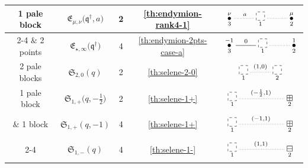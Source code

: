\documentclass[10pt,a4paper]{amsart}
\numberwithin{equation}{section}
\newcommand{\sele}{\mathfrak{S}}
\newcommand{\eny}{\mathfrak{E}}
\newcommand{\enyIIb}[1]{\eny_{\star,#1}}
\newcommand{\bq}{\mathfrak{q}}
\newcommand{\bqs}{\bq^{\dagger}}
\begin{document}
\begin{table}[ht]
\begin{tabular}{c| c c c |c}
{\small 1 pale block}
& $\eny_{\mu, \nu}\big(\bqs, a\big)$ & 2 & \ref{th:endymion-rank4-1} & $\xymatrix{
\overset{\nu}{\underset{3}{\bullet}} \ar@{.}^{a}[r]
&\underset{1}{\begin{tikzpicture}
\draw[dashed] (0,0) rectangle (0.36,0.36);
\end{tikzpicture}} \ar @{.}[r]
& \overset{\mu}{\underset{2}{\bullet}}}$
\\ \cline{2-4}
$\&$ {\small 2 points} & $\enyIIb{\infty}\big(\bqs\big)$ & 4 & \ref{th:endymion-2pts-case-a} &
$\xymatrix{
\overset{-1}{\underset{3}{\bullet}} \ar@{-}^{0}[r]
&\underset{1}{\begin{tikzpicture}
\draw[dashed] (0,0) rectangle (0.36,0.36);
\end{tikzpicture}} \ar @{.}[r]
& \overset{1}{\underset{2}{\bullet}}}$
\\ \hline
{\small 2 pale blocks} & $\sele_{2,0}(q)$ & 2 & \ref{th:selene-2-0} &
$\xymatrix{
\underset{1}{\begin{tikzpicture}
\draw[dashed] (0,0) rectangle (0.36,0.36);
\end{tikzpicture}} \ar@{.}^{(1,0)}[r]
&\underset{2}{\begin{tikzpicture}
\draw[dashed] (0,0) rectangle (0.36,0.36);
\end{tikzpicture}} }$
\\ \hline
{\small 1 pale block}
& $\sele_{1,+}\big(q,-\frac12\big)$ & 2 &\ref{th:selene-1+}
& $
\xymatrix{
\underset{1}{\begin{tikzpicture}
\draw[dashed] (0,0) rectangle (0.36,0.36);
\end{tikzpicture}} \ar @{.}^{(-\frac12,1)}[rr]
& &\underset{2}{\boxplus}}$
\\
$\&$ {\small 1 block}
& $\sele_{1,+}(q,-1)$ & 4 &\ref{th:selene-1+}
& $
\xymatrix{
\underset{1}{\begin{tikzpicture}
\draw[dashed] (0,0) rectangle (0.36,0.36);
\end{tikzpicture}} \ar @{.}^{(-1,1)}[rr]
& &\underset{2}{\boxplus}}$
\\ \cline{2-4}
& $\sele_{1,-}(q)$ & 4 &\ref{th:selene-1-}
& $ \xymatrix{ \underset{1}{\begin{tikzpicture}
\draw[dashed] (0,0) rectangle (0.36,0.36);
\end{tikzpicture}} \ar @{.}^{(1,1)}[rr]
& &\underset{2}{\boxminus}}$
\\
\hline
\end{tabular}
\end{table}
\end{document}
